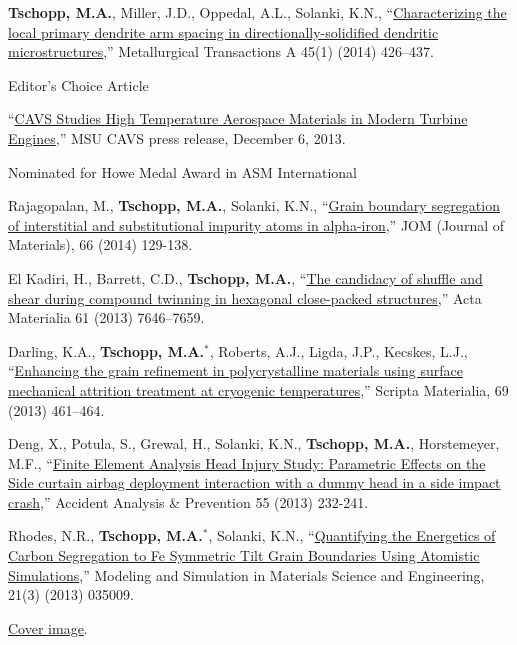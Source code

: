 \begin{cvlist}
\item
\textbf{Tschopp, M.A.}, Miller, J.D., {Oppedal, A.L.}, Solanki, K.N., ``\href{http://dx.doi.org/10.1007/s11661-013-1985-3}{Characterizing the local primary dendrite arm spacing in directionally-solidified dendritic microstructures},'' Metallurgical Transactions A 45(1) (2014) 426--437.
\begin{list2}
\item[$\star$] Editor's Choice Article
\item[$\star$]
``\href{https://www.cavs.msstate.edu/story.php?d=387}{CAVS Studies High Temperature Aerospace Materials in Modern Turbine Engines},'' MSU CAVS press release, December 6, 2013.
\item[$\star$] Nominated for Howe Medal Award in ASM International
\end{list2}

\item
{Rajagopalan, M.}, \textbf{Tschopp, M.A.}, Solanki, K.N.,  ``\href{http://dx.doi.org/10.1007/s11837-013-0807-9}{Grain boundary segregation of interstitial and substitutional impurity atoms in alpha-iron},'' JOM (Journal of Materials), 66 (2014) 129-138.

\item
El Kadiri, H., {Barrett, C.D.}, \textbf{Tschopp, M.A.}, ``\href{http://dx.doi.org/10.1016/j.actamat.2013.09.002}{The candidacy of shuffle and shear during compound twinning in hexagonal close-packed structures},'' Acta Materialia 61 (2013) 7646--7659.

\item
Darling, K.A., \textbf{Tschopp, M.A.}$^\ast$, Roberts, A.J., Ligda, J.P., Kecskes, L.J., ``\href{http://dx.doi.org/10.1016/j.scriptamat.2013.05.036}{Enhancing the grain refinement in polycrystalline materials using surface mechanical attrition treatment at cryogenic temperatures},'' Scripta Materialia, 69 (2013) 461--464.

\item
{Deng, X.}, {Potula, S.}, Grewal, H., Solanki, K.N., \textbf{Tschopp, M.A.}, Horstemeyer, M.F., ``\href{http://dx.doi.org/10.1016/j.aap.2013.03.016}{Finite Element Analysis Head Injury Study: Parametric Effects on the Side curtain airbag deployment interaction with a dummy head in a side impact crash},'' Accident Analysis \& Prevention 55 (2013) 232-241.

\item
{Rhodes, N.R.}, \textbf{Tschopp, M.A.}$^\ast$, Solanki, K.N., ``\href{http://dx.doi.org/10.1088/0965-0393/21/3/035009}{Quantifying the Energetics of Carbon Segregation to Fe Symmetric Tilt Grain Boundaries Using Atomistic Simulations},'' Modeling and Simulation in Materials Science and Engineering, 21(3) (2013) 035009.
\begin{list2}
\item[$\star$] \href{http://ej.iop.org/pdf/msmse/covers/21/MSMSE_21_3_cover.pdf}{Cover image}.
\end{list2}


\end{cvlist}
